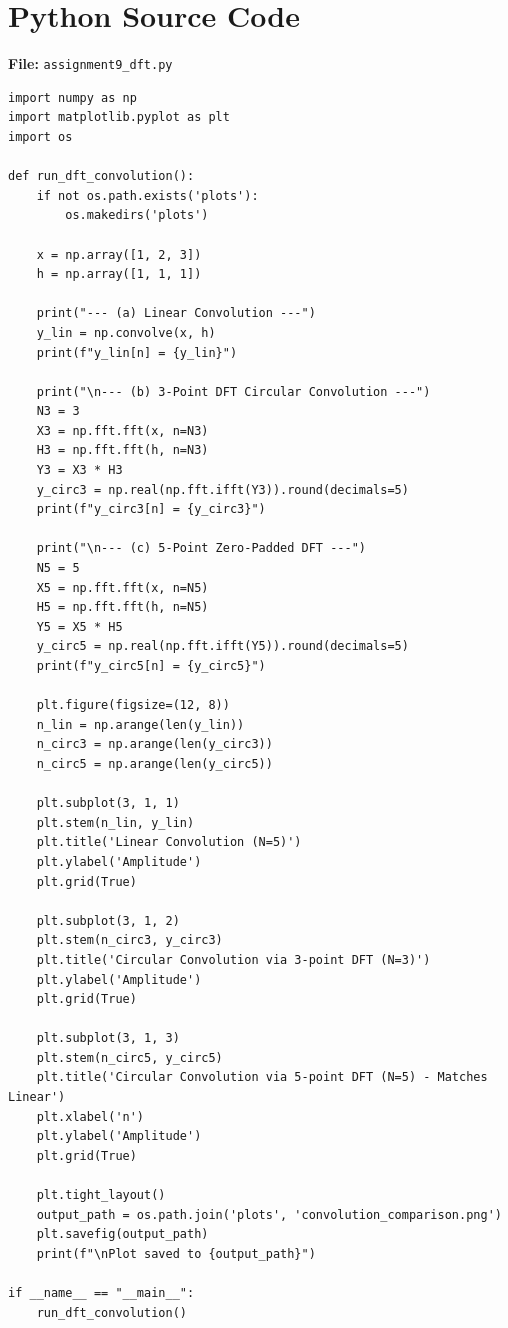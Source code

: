 \documentclass[11pt, a4paper]{article}
\begin{document}
\section{Python Source Code}
\textbf{File:} \texttt{assignment9\_dft.py}
\begin{lstlisting}[caption={DFT Convolution: Linear vs. Circular -- Assignment 9}]
import numpy as np
import matplotlib.pyplot as plt
import os

def run_dft_convolution():
    if not os.path.exists('plots'):
        os.makedirs('plots')

    x = np.array([1, 2, 3])
    h = np.array([1, 1, 1])

    print("--- (a) Linear Convolution ---")
    y_lin = np.convolve(x, h)
    print(f"y_lin[n] = {y_lin}")

    print("\n--- (b) 3-Point DFT Circular Convolution ---")
    N3 = 3
    X3 = np.fft.fft(x, n=N3)
    H3 = np.fft.fft(h, n=N3)
    Y3 = X3 * H3
    y_circ3 = np.real(np.fft.ifft(Y3)).round(decimals=5)
    print(f"y_circ3[n] = {y_circ3}")

    print("\n--- (c) 5-Point Zero-Padded DFT ---")
    N5 = 5
    X5 = np.fft.fft(x, n=N5)
    H5 = np.fft.fft(h, n=N5)
    Y5 = X5 * H5
    y_circ5 = np.real(np.fft.ifft(Y5)).round(decimals=5)
    print(f"y_circ5[n] = {y_circ5}")

    plt.figure(figsize=(12, 8))
    n_lin = np.arange(len(y_lin))
    n_circ3 = np.arange(len(y_circ3))
    n_circ5 = np.arange(len(y_circ5))

    plt.subplot(3, 1, 1)
    plt.stem(n_lin, y_lin)
    plt.title('Linear Convolution (N=5)')
    plt.ylabel('Amplitude')
    plt.grid(True)

    plt.subplot(3, 1, 2)
    plt.stem(n_circ3, y_circ3)
    plt.title('Circular Convolution via 3-point DFT (N=3)')
    plt.ylabel('Amplitude')
    plt.grid(True)

    plt.subplot(3, 1, 3)
    plt.stem(n_circ5, y_circ5)
    plt.title('Circular Convolution via 5-point DFT (N=5) - Matches Linear')
    plt.xlabel('n')
    plt.ylabel('Amplitude')
    plt.grid(True)

    plt.tight_layout()
    output_path = os.path.join('plots', 'convolution_comparison.png')
    plt.savefig(output_path)
    print(f"\nPlot saved to {output_path}")

if __name__ == "__main__":
    run_dft_convolution()
\end{lstlisting}
\end{document}
